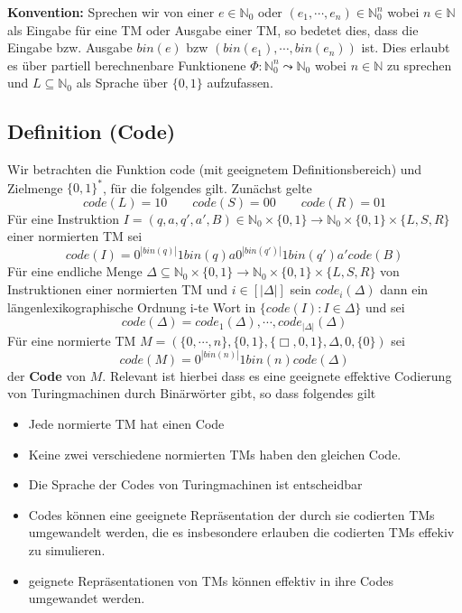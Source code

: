 
\textbf{Konvention: } Sprechen wir von einer $e \in \mathbb{N}_0$ oder $(e_1, \cdots, e_n) \in \mathbb{N}_0^n$ wobei $n \in \mathbb{N}$ als Eingabe für eine TM oder Ausgabe einer TM, so bedetet dies, dass die Eingabe bzw. Ausgabe $bin(e)$ bzw $(bin(e_1), \cdots, bin(e_n))$ ist. Dies erlaubt es über partiell berechnenbare Funktionene $\Phi: \mathbb{N}_0^n \leadsto \mathbb{N}_0$ wobei $n\in \mathbb{N}$ zu sprechen und $L \subseteq \mathbb{N}_0$ als Sprache über $\{0, 1\}$ aufzufassen.

\subsection{Definition (Code)} Wir betrachten die Funktion code (mit geeignetem Definitionsbereich) und Zielmenge $\{0, 1\}^*$, für die folgendes gilt. Zunächst gelte \[code(L) = 10 \qquad code (S) = 00 \qquad code(R) = 01\] Für eine Instruktion $ I = (q, a, q', a', B) \in \mathbb{N}_0 \times \{0, 1\} \to \mathbb{N}_0 \times \{0, 1\} \times \{L, S, R\}$ einer normierten TM sei \[code (I) = 0^{|bin(q)|} 1 bin (q) a 0^{|bin(q')|} 1 bin (q') a' code (B)\] Für eine endliche Menge $ \Delta \subseteq \mathbb{N}_0 \times \{0, 1\} \to \mathbb{N}_0 \times \{0, 1\}\times \{L, S, R\}$ von Instruktionen einer normierten TM und $i \in [|\Delta|]$ sein $code_i(\Delta)$ dann ein längenlexikographische Ordnung i-te Wort in $\{code(I): I \in \Delta\}$ und sei \[ code (\Delta) = code_1(\Delta), \cdots, code_{|\Delta|}(\Delta)\] Für eine normierte TM $M = (\{0, \cdots, n\}, \{0, 1\}, \{\Box, 0, 1\}, \Delta, 0, \{0\})$ sei \[ code (M) = 0^{|bin(n)|} 1 bin (n) code (\Delta)\] der \textbf{Code} von $M$. Relevant ist hierbei dass es eine geeignete effektive Codierung von Turingmachinen durch Binärwörter gibt, so dass folgendes gilt 
\begin{itemize}
  \item Jede normierte TM hat einen Code 
  \item Keine zwei verschiedene normierten TMs haben den gleichen Code.
  \item Die Sprache der Codes von Turingmachinen ist entscheidbar
  \item Codes können eine geeignete Repräsentation der durch sie codierten TMs umgewandelt werden, die es insbesondere erlauben die codierten TMs effekiv zu simulieren.
  \item geignete Repräsentationen von TMs können effektiv in ihre Codes umgewandet werden.
\end{itemize}

